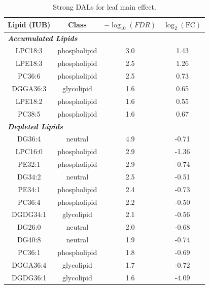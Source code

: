 \documentclass[9pt,twocolumn,twoside]{rilabRxiv}
\begin{document}
\clearpage

\begin{table}[h!]
\centering
\footnotesize
\caption{Strong DALs for leaf main effect.}
\label{table::leaf_lipids}
\begin{tabular}{cccc}
\hline
\textbf{Lipid (IUB)} & \textbf{Class} & \textbf{$-\log_{10}(\textit{FDR})$} & \textbf{$\log_2(\text{FC})$}\\
\hline
\multicolumn{4}{l}{\textit{\textbf{Accumulated Lipids}}} \\
\hline
LPC18:3 & phospholipid & 3.0 & 1.43\\
LPE18:3 & phospholipid & 2.5 & 1.26\\
PC36:6 & phospholipid & 2.5 & 0.73\\
DGGA36:3 & glycolipid & 1.6 & 0.65\\
LPE18:2 & phospholipid & 1.6 & 0.55\\
PC38:5 & phospholipid & 1.6 & 0.67\\
\hline
\multicolumn{4}{l}{\textit{\textbf{Depleted Lipids}}} \\
\hline
DG36:4 & neutral & 4.9 & -0.71\\
LPC16:0 & phospholipid & 2.9 & -1.36\\
PE32:1 & phospholipid & 2.9 & -0.74\\
DG34:2 & neutral & 2.5 & -0.51\\
PE34:1 & phospholipid & 2.4 & -0.73\\
PC36:4 & phospholipid & 2.2 & -0.50\\
DGDG34:1 & glycolipid & 2.1 & -0.56\\
DG26:0 & neutral & 2.0 & -0.68\\
DG40:8 & neutral & 1.9 & -0.74\\
PC36:1 & phospholipid & 1.8 & -0.69\\
DGGA36:4 & glycolipid & 1.7 & -0.72\\
DGDG36:1 & glycolipid & 1.6 & -4.09\\
\hline
\end{tabular}
\end{table}

\clearpage
\end{document}
